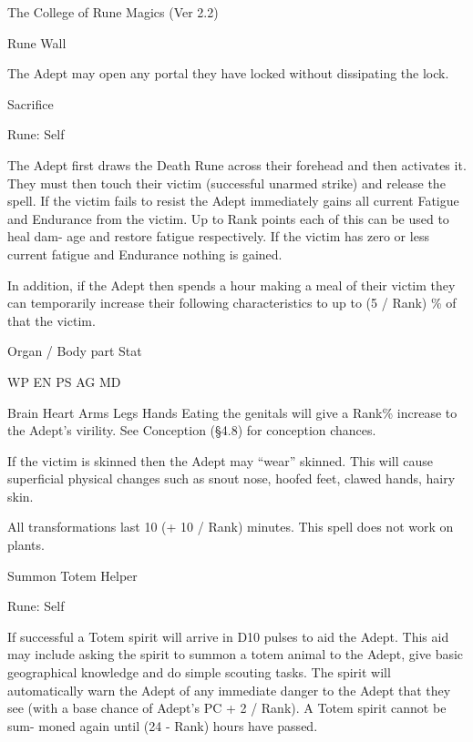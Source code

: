 \begin{Chapter}{The College of Rune Magics (Ver 2.2)}
\begin{spell}[S-11]{Rune Wall }
\begin{effects}
The  Adept  may  open  any  portal  they  have  locked 
without dissipating the lock. 

\end{effects}
\end{spell}

\begin{spell}[S-12]{Sacrifice }

Rune: Self 
\begin{effects}
 The  Adept  first  draws  the  Death  Rune 
across  their  forehead  and  then  activates  it.  They 
must  then  touch  their  victim  (successful  unarmed 
strike)  and  release  the  spell.  If  the  victim  fails  to 
resist  the  Adept  immediately  gains  all  current 
Fatigue  and  Endurance  from  the  victim.  Up  to 
Rank points each of this can be used to heal dam-
age  and  restore  fatigue  respectively.  If  the  victim 
has  zero  or  less  current  fatigue  and  Endurance 
nothing is gained. 

In addition, if the Adept then spends a hour making 
a meal of their victim they can temporarily increase 
their following characteristics to up to (5 / Rank) \% 
of that the victim. 

Organ / Body part  Stat  

WP  
EN  
PS  
AG  
MD 

Brain 
Heart 
Arms 
Legs 
Hands 
Eating  the  genitals  will  give  a  Rank\%  increase  to 
the  Adept’s  virility.  See  Conception  (§4.8)  for 
conception chances. 

If the victim is skinned then the Adept may “wear” 
skinned.  This  will  cause  superficial  physical 
changes  such  as  snout  nose,  hoofed  feet,  clawed 
hands, hairy skin. 

All transformations last 10 (+  10 / Rank) minutes. 
This spell does not work on plants. 





\end{effects}
\end{spell}

\begin{spell}[S-13]{Summon Totem Helper }

Rune: Self 
\begin{effects}
 If  successful  a  Totem  spirit  will  arrive  in 
D10 pulses to aid the Adept. This aid may include 
asking  the  spirit to  summon  a  totem animal  to  the 
Adept,  give  basic  geographical  knowledge  and  do 
simple scouting tasks. The spirit will automatically 
warn  the  Adept  of  any  immediate  danger  to  the 
Adept that they see (with a base chance of Adept’s 
PC  +  2  /  Rank).  A  Totem  spirit  cannot  be  sum-
moned again until (24 - Rank) hours have passed. 


\end{effects}
\end{spell}
\end{Chapter}
